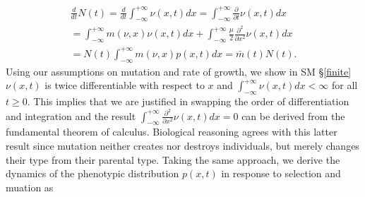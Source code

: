 \documentclass[]{article}
\begin{document}
\begin{multline}\label{N_det}
\frac{d}{dt}N(t)=\frac{d}{dt}\int_{-\infty}^{+\infty}\nu(x,t)dx=\int_{-\infty}^{+\infty}\frac{\partial}{\partial t}\nu(x,t)dx \\
=\int_{-\infty}^{+\infty} m(\nu,x)\nu(x,t)dx+\int_{-\infty}^{+\infty}\frac{\mu}{2}\frac{\partial^2}{\partial x^2}\nu(x,t)dx \\
=N(t)\int_{-\infty}^{+\infty} m(\nu,x)p(x,t)dx=\bar m(t) N(t).
\end{multline} Using our assumptions on mutation and rate of growth, we
show in SM \S\ref{finite} \(\nu(x,t)\) is twice differentiable with
respect to \(x\) and \(\int_{-\infty}^{+\infty}\nu(x,t)dx<\infty\) for
all \(t\geq0\). This implies that we are justified in swapping the order
of differentiation and integration and the result
\(\int_{-\infty}^{+\infty}\frac{\partial^2}{\partial x^2}\nu(x,t)dx=0\)
can be derived from the fundamental theorem of calculus. Biological
reasoning agrees with this latter result since mutation neither creates
nor destroys individuals, but merely changes their type from their
parental type. Taking the same approach, we derive the dynamics of the
phenotypic distribution \(p(x,t)\) in response to selection and muation
as
\end{document}

